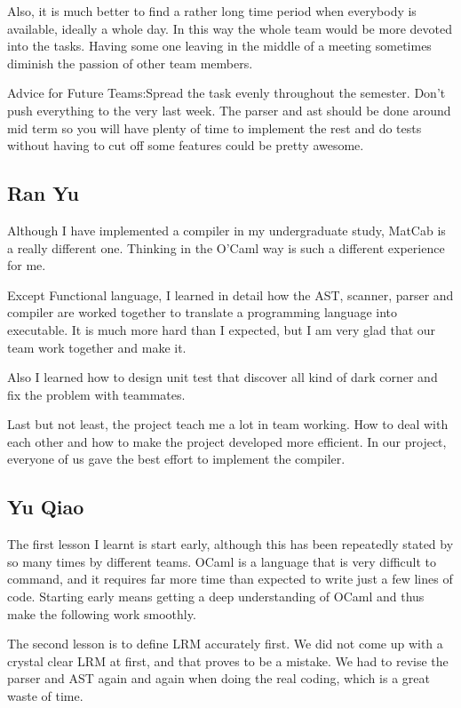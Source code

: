 \documentclass[12pt]{article} %
\begin{document}
Also, it is much better to find a rather long time period when everybody is available, ideally a whole day. In this way the whole team would be more devoted into the tasks. Having some one leaving in the middle of a meeting sometimes diminish the passion of other team members. 

Advice for Future Teams:Spread the task evenly throughout the semester. Don’t push everything to the very last week. The parser and ast should be done around mid term so you will have plenty of time to implement the rest and do tests without having to cut off some features could be pretty awesome. 

\subsection{Ran Yu}
Although I have implemented a compiler in my undergraduate study, MatCab is a really different one. Thinking in the O'Caml way is such a different experience for me.
 
Except Functional language, I learned in detail how the AST, scanner, parser and compiler are worked together to translate a programming language into executable. It is much more hard than I expected, but I am very glad that our team work together and make it.

Also I learned how to design unit test that discover all kind of dark corner and fix the problem with teammates.

Last but not least, the project teach me a lot in team working. How to deal with each other and how to make the project developed more efficient. In our project, everyone of us gave the best effort to implement the compiler. 

\subsection{Yu Qiao}
The first lesson I learnt is start early, although this has been repeatedly stated by so many times by different teams. OCaml is a language that is very difficult to command, and it requires far more time than expected to write just a few lines of code. Starting early means getting a deep understanding of OCaml and thus make the following work smoothly. 

The second lesson is to define LRM accurately first. We did not come up with a crystal clear LRM at first, and that proves to be a mistake. We had to revise the parser and AST again and again when doing the real coding, which is a great waste of time. 
\end{document}
